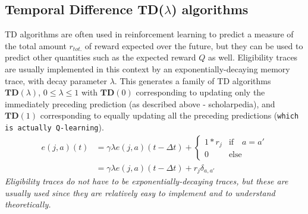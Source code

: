 \documentclass[11pt]{article}
\begin{document}
\subsection{Temporal Difference TD($\lambda$) algorithms}
TD algorithms are often used in reinforcement learning to predict a measure of the total amount $r_{tot.}$ of reward expected over the future, but they can be used to predict other quantities such as the expected reward $Q$ as well. Eligibility traces are usually implemented in this context by an exponentially-decaying memory trace, with decay parameter $\lambda$. This generates a family of TD algorithms $\mathbf{TD}(\lambda)$, $0\leq\lambda\leq 1$  with $\mathbf{TD}(0)$ corresponding to updating only the immediately preceding prediction (as described above - scholarpedia), and $\mathbf{TD}(1)$ corresponding to equally updating all the preceding predictions (\texttt{which is actually Q-learning}). %
\begin{align*}
e(j,a)(t)&=\gamma\lambda e(j,a)(t-\Delta t)+\left\{\begin{array}{ll} 1*r_j & \text{if}\quad a=a'\\ 0 & \text{else}\end{array}\right.\\
&=\gamma\lambda e(j,a)(t-\Delta t)+r_j\delta_{a,a'}
\end{align*}
\textit{Eligibility traces do not have to be exponentially-decaying traces, but these are usually used since they are relatively easy to implement and to understand theoretically.}

\end{document}
